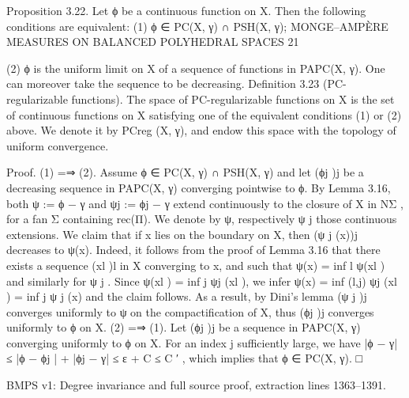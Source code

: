 \documentclass[
  11pt,
]{article}
\newenvironment{Shaded}{}{}
\newcommand{\NormalTok}[1]{#1}
\begin{document}
\begin{Shaded}
\begin{Highlighting}[]
\NormalTok{Proposition 3.22. Let ϕ be a continuous function on X. Then the following conditions are}
\NormalTok{equivalent:}
\NormalTok{     (1) ϕ ∈ PC(X, γ) ∩ PSH(X, γ);}
\NormalTok{                  MONGE–AMPÈRE MEASURES ON BALANCED POLYHEDRAL SPACES                             21}


\NormalTok{   (2) ϕ is the uniform limit on X of a sequence of functions in PAPC(X, γ). One can moreover}
\NormalTok{       take the sequence to be decreasing.}
\NormalTok{Definition 3.23 (PC{-}regularizable functions). The space of PC{-}regularizable functions on X}
\NormalTok{is the set of continuous functions on X satisfying one of the equivalent conditions (1) or (2) above.}
\NormalTok{We denote it by PCreg (X, γ), and endow this space with the topology of uniform convergence.}

\NormalTok{Proof. (1) =⇒ (2). Assume ϕ ∈ PC(X, γ) ∩ PSH(X, γ) and let (ϕj )j be a decreasing sequence}
\NormalTok{in PAPC(X, γ) converging pointwise to ϕ. By Lemma 3.16, both ψ := ϕ − γ and ψj := ϕj − γ}
\NormalTok{extend continuously to the closure of X in NΣ , for a fan Σ containing rec(Π). We denote by ψ,}
\NormalTok{respectively ψ j those continuous extensions. We claim that if x lies on the boundary on X, then}
\NormalTok{(ψ j (x))j decreases to ψ(x). Indeed, it follows from the proof of Lemma 3.16 that there exists a}
\NormalTok{sequence (xl )l in X converging to x, and such that ψ(x) = inf l ψ(xl ) and similarly for ψ j . Since}
\NormalTok{ψ(xl ) = inf j ψj (xl ), we infer ψ(x) = inf (l,j) ψj (xl ) = inf j ψ j (x) and the claim follows.}
\NormalTok{As a result, by Dini’s lemma (ψ j )j converges uniformly to ψ on the compactification of X, thus}
\NormalTok{(ϕj )j converges uniformly to ϕ on X.}
\NormalTok{   (2) =⇒ (1). Let (ϕj )j be a sequence in PAPC(X, γ) converging uniformly to ϕ on X. For an}
\NormalTok{index j sufficiently large, we have}
\NormalTok{                            |ϕ − γ| ≤ |ϕ − ϕj | + |ϕj − γ| ≤ ε + C ≤ C ′ ,}
\NormalTok{which implies that ϕ ∈ PC(X, γ).                                                                   □}
\end{Highlighting}
\end{Shaded}

BMPS v1: Degree invariance and full source proof, extraction lines
1363--1391.
\end{document}
